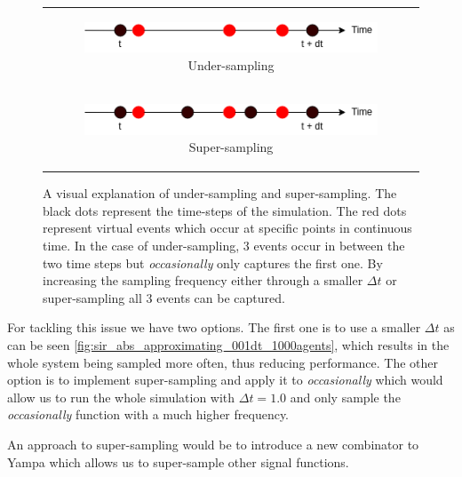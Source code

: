 \begin{figure}
\begin{center}
	\begin{tabular}{c}
		\begin{subfigure}[b]{0.3\textwidth}
			\centering
			\includegraphics[width=1\textwidth, angle=0]{./fig/diagrams/Undersampling.png}
			\caption{Under-sampling}
			\label{fig:undersampling}
		\end{subfigure}
		
		\\
		
		\begin{subfigure}[b]{0.3\textwidth}
			\centering
			\includegraphics[width=1\textwidth, angle=0]{./fig/diagrams/Supersampling.png}
			\caption{Super-sampling}
			\label{fig:supersampling}
		\end{subfigure}
	\end{tabular}
	
	\caption{A visual explanation of under-sampling and super-sampling. The black dots represent the time-steps of the simulation. The red dots represent virtual events which occur at specific points in continuous time. In the case of under-sampling, 3 events occur in between the two time steps but \textit{occasionally} only captures the first one. By increasing the sampling frequency either through a smaller $\Delta t$ or super-sampling all 3 events can be captured.} 
	\label{fig:sampling_issue}
\end{center}
\end{figure}

For tackling this issue we have two options. The first one is to use a smaller $\Delta t$ as can be seen \ref{fig:sir_abs_approximating_001dt_1000agents}, which results in the whole system being sampled more often, thus reducing performance. The other option is to implement super-sampling and apply it to \textit{occasionally} which would allow us to run the whole simulation with $\Delta t = 1.0$ and only sample the \textit{occasionally} function with a much higher frequency.

An approach to super-sampling would be to introduce a new combinator to Yampa which allows us to super-sample other signal functions. 

